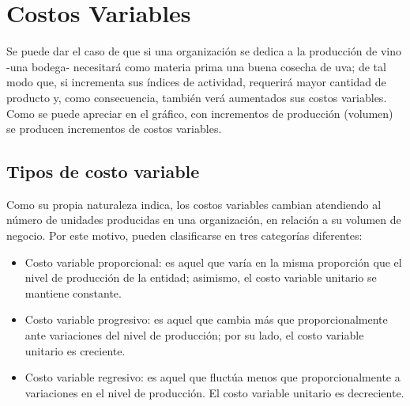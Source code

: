 \documentclass[../main]{subfiles}
\begin{document}
\chapter{Costos Variables}
Se puede dar el caso de que si una organización se dedica a la
producción de vino -una bodega- necesitará como materia prima una
buena cosecha de uva; de tal modo que, si incrementa sus índices de
actividad, requerirá mayor cantidad de producto y, como consecuencia,
también verá aumentados sus costos variables. Como se puede apreciar
en el gráfico, con incrementos de producción (volumen) se producen
incrementos de costos variables.
\section{Tipos de costo variable}
Como su propia naturaleza indica, los costos variables cambian
atendiendo al número de unidades producidas en una organización, en
relación a su volumen de negocio. Por este motivo, pueden clasificarse
en tres categorías diferentes:
\begin{itemize}
  \item Costo variable proporcional: es aquel que varía
    en la misma proporción que el nivel de producción de la entidad;
    asimismo, el costo variable unitario se mantiene constante.

  \item Costo variable progresivo: es aquel que cambia más
    que proporcionalmente ante variaciones del nivel de producción;
    por su lado, el costo variable unitario es creciente.

  \item Costo variable regresivo: es aquel que fluctúa menos que
    proporcionalmente a variaciones en el nivel de producción. El
    costo variable unitario es decreciente.
\end{itemize}
\end{document}
